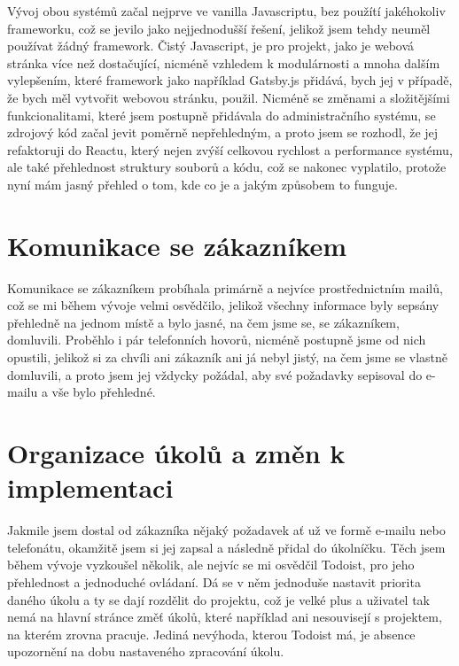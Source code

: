 \documentclass[12pt,a4paper]{report}
\begin{document}
  Vývoj obou systémů začal nejprve ve vanilla Javascriptu, bez použítí jakéhokoliv frameworku, což
  se jevilo jako nejjednodušší řešení, jelikož jsem tehdy neuměl používat žádný framework. Čistý Javascript, je pro projekt, jako je webová stránka více než
  dostačující, nicméně vzhledem k modulárnosti a mnoha dalším vylepšením, které framework jako například Gatsby.js přidává, bych jej v případě, že bych měl vytvořit webovou stránku, použil.
  Nicméně se změnami a složitějšími funkcionalitami, které jsem postupně přidávala do administračního systému, se zdrojový kód začal jevit
  poměrně nepřehledným, a proto jsem se rozhodl, že jej refaktoruji do Reactu, který nejen zvýší celkovou rychlost a performance systému, ale také přehlednost struktury souborů a kódu,
  což se nakonec vyplatilo, protože nyní mám jasný přehled o tom, kde co je a jakým způsobem to funguje.

  \section{Komunikace se zákazníkem}
  Komunikace se zákazníkem probíhala primárně a nejvíce prostřednictním mailů,
  což se mi během vývoje velmi osvědčilo, jelikož všechny informace byly sepsány přehledně
  na jednom místě a bylo jasné, na čem jsme se, se zákazníkem, domluvili. Proběhlo i pár telefonních hovorů,
  nicméně postupně jsme od nich opustili, jelikož si za chvíli ani zákazník ani já nebyl jistý, na čem jsme se vlastně domluvili, a proto jsem jej vždycky
  požádal, aby své požadavky sepisoval do e-mailu a vše bylo přehledné.
 
  \section{Organizace úkolů a změn k implementaci}
  Jakmile jsem dostal od zákazníka nějaký požadavek ať už ve formě e-mailu nebo telefonátu, okamžitě jsem si jej 
  zapsal a následně přidal do úkolníčku. Těch jsem během vývoje vyzkoušel několik, ale nejvíc se mi osvědčil 
  Todoist, pro jeho přehlednost a jednoduché ovládaní. Dá se v něm jednoduše nastavit priorita daného úkolu a ty se dají rozdělit
  do projektu, což je velké plus a uživatel tak nemá na hlavní stránce změť úkolů, které například ani nesouvisejí s projektem, na kterém zrovna pracuje.
  Jediná nevýhoda, kterou Todoist má, je absence upozornění na dobu nastaveného zpracování úkolu. 
\end{document}
